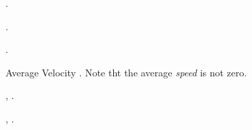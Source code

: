 {\begin{two-digit-list}
\item [14.] \NullItem
\begin{one-digit-list}
\item [a.] .
\item [b.] .
\item [c.] .
\end{one-digit-list}

\item [15.] Average Velocity
            .
            Note tht the average \emph{speed} is not zero.

\item [16.] \NullItem
\begin{one-digit-list}
\item [a.] , .
\item [b.] , .
\end{one-digit-list}

\item [17.] 
\end{two-digit-list}

}%